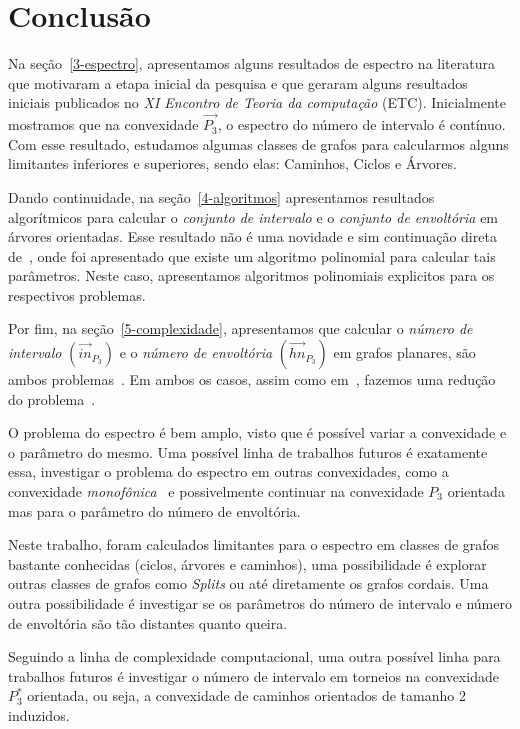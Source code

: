 \chapter{Conclusão}\label{6-conclusao}

Na seção~\ref{3-espectro}, apresentamos alguns resultados de espectro na literatura que motivaram a etapa inicial da pesquisa e que geraram alguns resultados iniciais publicados no \emph{XI Encontro de Teoria da computação} (ETC). Inicialmente mostramos que na convexidade $\overrightarrow{P_3}$, o espectro do número de intervalo é contínuo. Com esse resultado, estudamos algumas classes de grafos para calcularmos alguns limitantes inferiores e superiores, sendo elas: Caminhos, Ciclos e Árvores.

Dando continuidade, na seção~\ref{4-algoritmos} apresentamos resultados algorítmicos para calcular o \emph{conjunto de intervalo} e o \emph{conjunto de envoltória} em árvores orientadas. Esse resultado não é uma novidade e sim continuação direta de~\cite{Medeiros2024Convexidade}, onde foi apresentado que existe um algoritmo polinomial para calcular tais parâmetros. Neste caso, apresentamos algoritmos polinomiais explicitos para os respectivos problemas.

Por fim, na seção~\ref{5-complexidade}, apresentamos que calcular o \emph{número de intervalo} $(\overrightarrow{in}_{P_3})$ e o \emph{número de envoltória} $(\overrightarrow{hn}_{P_3})$ em grafos planares, são ambos problemas~\npcs. Em ambos os casos, assim como em~\cite{PENSO201583}, fazemos uma redução do problema~\sam.

O problema do espectro é bem amplo, visto que é possível variar a convexidade e o parâmetro do mesmo. Uma possível linha de trabalhos futuros é exatamente essa, investigar o problema do espectro em outras convexidades, como a convexidade \emph{monofônica}~\cite{duchet1988convex,dourado2010complexity} e possivelmente continuar na convexidade $P_3$ orientada mas para o parâmetro do número de envoltória.

Neste trabalho, foram calculados limitantes para o espectro em classes de grafos bastante conhecidas (ciclos, árvores e caminhos), uma possibilidade é explorar outras classes de grafos como \emph{Splits} ou até diretamente os grafos cordais. Uma outra possibilidade é investigar se os parâmetros do número de intervalo e número de envoltória são tão distantes quanto queira.

Seguindo a linha de complexidade computacional, uma outra possível linha para trabalhos futuros é investigar o número de intervalo em torneios na convexidade $P_3^*$ orientada, ou seja, a convexidade de caminhos orientados de tamanho 2 induzidos. 